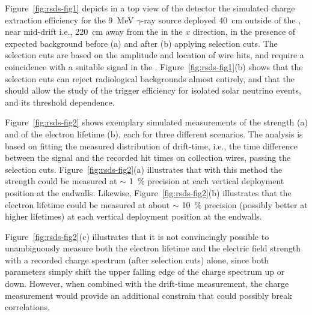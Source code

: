 Figure~\ref{fig:rsds-fig1}
depicts in a top view of the detector the simulated charge extraction efficiency for the 9~MeV $\gamma$-ray source deployed \SI{40}{\cm} outside of the , near mid-drift i.e., \SI{220}{\cm} away from the  in the $x$ direction, in the presence of expected background before (a) and after (b) applying selection cuts. The selection cuts
are based on the amplitude and location of wire hits, and require a coincidence with a suitable signal in the .
Figure~\ref{fig:rsds-fig1}(b)
shows that the selection cuts can reject radiological backgrounds almost entirely, and that
the  should allow the study of the trigger efficiency for isolated solar neutrino events, and its threshold dependence.


Figure~\ref{fig:rsds-fig2}
shows exemplary simulated %
 measurements of the \efield strength (a) and of the electron lifetime (b), each for three different scenarios. The analysis is based on fitting the measured distribution of drift-time, i.e., the time difference between the  signal
and the recorded hit times on collection wires, passing the selection cuts. 
Figure~\ref{fig:rsds-fig2}(a)
illustrates that with this method the \efield strength could be measured at $\sim$ \SI{1}{\%} precision at each vertical deployment position at the endwalls. Likewise, Figure~\ref{fig:rsds-fig2}(b)
illustrates that the electron lifetime could be measured at about $\sim$ \SI{10}{\%} precision (possibly better at higher lifetimes) at each vertical deployment position at the endwalls. 

Figure~\ref{fig:rsds-fig2}(c)
illustrates that it is not convincingly possible to unambiguously measure both the electron lifetime and the electric field strength with a recorded charge spectrum (after selection cuts) alone, since both parameters simply shift the upper falling edge of the charge spectrum up or down. However, when combined with the drift-time measurement, the charge measurement would provide an additional constrain that could possibly break correlations. 



